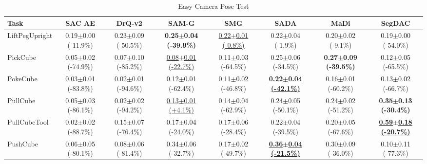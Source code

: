 \begin{table}[htbp]
\centering
\scriptsize
\caption{Easy Camera Pose Test}
\label{tab:appendix_cameraposetest_easy}
\begin{adjustbox}{max width=\textwidth}
\begin{tabular}{l*{7}{c}}
\toprule
\textbf{Task} & \textbf{SAC AE} & \textbf{DrQ-v2} & \textbf{SAM-G} & \textbf{SMG} & \textbf{SADA} & \textbf{MaDi} & \textbf{SegDAC} \\
\midrule
LiftPegUpright & 0.19$\pm$0.00 \scriptsize{(-11.9\%)} & 0.23$\pm$0.09 \scriptsize{(-50.5\%)} & \textbf{0.25$\pm$0.04 \scriptsize{(-39.9\%)}} & \underline{0.22$\pm$0.01 \scriptsize{(-0.8\%)}} & 0.22$\pm$0.04 \scriptsize{(-1.9\%)} & 0.20$\pm$0.02 \scriptsize{(-9.1\%)} & 0.19$\pm$0.00 \scriptsize{(-54.0\%)} \\
PickCube & 0.05$\pm$0.02 \scriptsize{(-74.9\%)} & 0.07$\pm$0.10 \scriptsize{(-85.2\%)} & \underline{0.08$\pm$0.01 \scriptsize{(-22.7\%)}} & 0.11$\pm$0.03 \scriptsize{(-64.5\%)} & 0.25$\pm$0.06 \scriptsize{(-34.5\%)} & \textbf{0.27$\pm$0.09 \scriptsize{(-39.5\%)}} & 0.12$\pm$0.05 \scriptsize{(-65.5\%)} \\
PokeCube & 0.03$\pm$0.01 \scriptsize{(-83.8\%)} & 0.02$\pm$0.01 \scriptsize{(-94.6\%)} & 0.12$\pm$0.01 \scriptsize{(-62.4\%)} & 0.11$\pm$0.02 \scriptsize{(-46.8\%)} & \textbf{\underline{0.22$\pm$0.04 \scriptsize{(-42.1\%)}}} & 0.16$\pm$0.01 \scriptsize{(-60.2\%)} & 0.13$\pm$0.02 \scriptsize{(-66.7\%)} \\
PullCube & 0.05$\pm$0.03 \scriptsize{(-86.1\%)} & 0.02$\pm$0.02 \scriptsize{(-94.2\%)} & \underline{0.13$\pm$0.01 \scriptsize{(+4.1\%)}} & 0.14$\pm$0.04 \scriptsize{(-62.9\%)} & 0.24$\pm$0.05 \scriptsize{(-50.1\%)} & 0.24$\pm$0.02 \scriptsize{(-51.2\%)} & \textbf{0.35$\pm$0.13 \scriptsize{(-30.4\%)}} \\
PullCubeTool & 0.02$\pm$0.02 \scriptsize{(-88.7\%)} & 0.15$\pm$0.07 \scriptsize{(-76.4\%)} & 0.17$\pm$0.04 \scriptsize{(-24.0\%)} & 0.17$\pm$0.06 \scriptsize{(-28.4\%)} & 0.22$\pm$0.04 \scriptsize{(-39.5\%)} & 0.20$\pm$0.05 \scriptsize{(-67.6\%)} & \textbf{\underline{0.59$\pm$0.18 \scriptsize{(-20.7\%)}}} \\
PushCube & 0.06$\pm$0.05 \scriptsize{(-80.1\%)} & 0.08$\pm$0.06 \scriptsize{(-81.4\%)} & 0.34$\pm$0.06 \scriptsize{(-32.7\%)} & 0.17$\pm$0.02 \scriptsize{(-49.7\%)} & \textbf{\underline{0.36$\pm$0.04 \scriptsize{(-21.5\%)}}} & 0.30$\pm$0.09 \scriptsize{(-36.0\%)} & 0.10$\pm$0.11 \scriptsize{(-77.3\%)} \\

\end{tabular}
\end{adjustbox}
\end{table}
